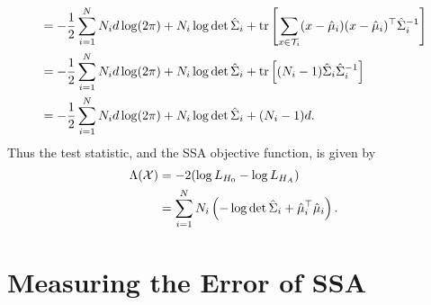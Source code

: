 \documentclass{article}
\newcommand{\1}{\ensuremath{\mathds{1}}}
\newcommand{\0}{\ensuremath{0}}
\DeclareMathOperator*{\trace}{tr}
\begin{document}
\begin{appendices}
\begin{align*}
& = -\frac{1}{2} \sum_{i=1}^N N_i d \log (2\pi)  + N_i \log \det \esi_i + 
		\trace\left[ \sum_{x \in \mathcal{T}_i} (x-\emu_i) (x-\emu_i)^\top \esi_i^{-1} \right] \\
& = -\frac{1}{2} \sum_{i=1}^N N_i d \log (2\pi) + N_i \log \det \esi_i + \trace\left[  (N_i-1) \esi_i \esi_i^{-1} \right] \\
& = -\frac{1}{2} \sum_{i=1}^N N_i d \log (2\pi) + N_i \log \det \esi_i + (N_i-1) d .
\end{align*}
Thus the test statistic, and the SSA objective function, is given by 
\begin{align*}
 \Lambda(\mathcal{X}) & = -2 ( \log L_{H_0} - \log L_{H_A} ) \\
 						& = \sum_{i=1}^N N_i \left(-\log \det\hat{\Sigma}_i + \hat{\mu}_i^\top \hat{\mu}_i \right) . 
\end{align*}

\section{Measuring the Error of SSA}
\label{app:error_measure}


\end{appendices}
\end{document}
